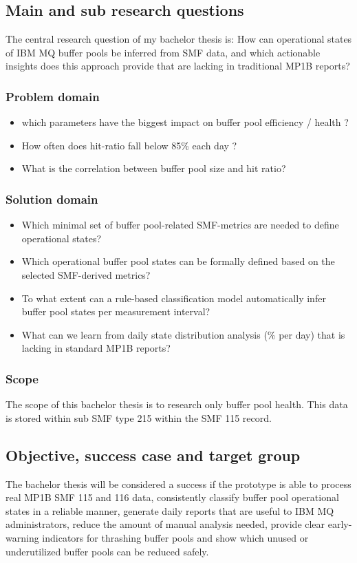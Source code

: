 \subsection{Main and sub research questions}%
The central research question of my bachelor thesis is: How can operational states of IBM MQ buffer pools be inferred from SMF data, and which actionable insights does this approach provide that are lacking in traditional MP1B reports?

\subsubsection{Problem domain}%
\begin{itemize}
    \item which parameters have the biggest impact on buffer pool efficiency / health ?
    \item How often does hit-ratio fall below 85\% each day ?
    \item What is the correlation between buffer pool size and hit ratio?
\end{itemize}

\subsubsection{Solution domain}%
\begin{itemize}
    \item Which minimal set of buffer pool-related SMF-metrics are needed to define operational states?
    \item Which operational buffer pool states can be formally defined based on the selected SMF-derived metrics?
    \item To what extent can a rule-based classification model automatically infer buffer pool states per measurement interval?
    \item What can we learn from daily state distribution analysis (\% per day) that is lacking in standard MP1B reports?
\end{itemize}

\subsubsection{Scope}%
The scope of this bachelor thesis is to research only buffer pool health. This data is stored within sub SMF type 215 within the SMF 115 record.

\subsection{Objective, success case and target group}%
The bachelor thesis will be considered a success if the prototype is able to process real MP1B SMF 115 and 116 data, consistently classify buffer pool operational states in a reliable manner, generate daily reports that are useful to IBM MQ administrators, reduce the amount of manual analysis needed, provide clear early-warning indicators for thrashing buffer pools and show which unused or underutilized buffer pools  can be reduced safely. 

